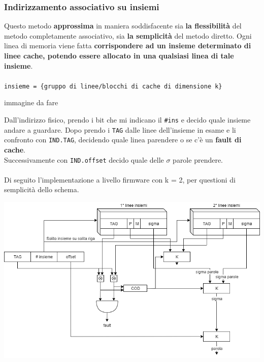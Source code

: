 \documentclass[10pt]{report}
\begin{document}
\subsubsection{Indirizzamento associativo su insiemi}
Questo metodo \textbf{approssima} in maniera soddisfacente sia \textbf{la flessibilità} del metodo completamente associativo, sia \textbf{la semplicità} del metodo diretto. Ogni linea di memoria viene fatta \textbf{corrispondere ad un insieme determinato di linee cache, potendo essere allocato in una qualsiasi linea di tale insieme}.\\\\
\texttt{insieme = \{gruppo di linee/blocchi di cache di dimensione k\}}
\begin{center}
immagine da fare
\end{center}
Dall'indirizzo fisico, prendo i bit che mi indicano il \texttt{\#ins} e decido quale insieme andare a guardare. Dopo prendo i \texttt{TAG} dalle linee dell'insieme in esame e li confronto con \texttt{IND.TAG}, decidendo quale linea parendere o se c'è un \textbf{fault di cache}.\\
Successivamente con \texttt{IND.offset} decido quale delle $\sigma$ parole prendere.\\\\
Di seguito l'implementazione a livello firmware con k = 2, per questioni di semplicità dello schema.
\begin{center}
\includegraphics[scale=0.68]{associnsk2.png}
\end{center}
\end{document}
